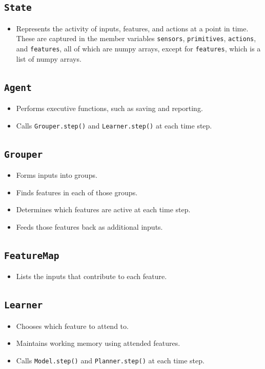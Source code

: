 \subsection{\texttt{State}}
\begin{itemize}
\item Represents the activity of inputs, features, and actions at a point in time. These are captured in the member variables \texttt{sensors}, \texttt{primitives}, \texttt{actions}, and \texttt{features}, all of which are numpy arrays, except for \texttt{features}, which is a list of numpy arrays. 
\end{itemize}

\subsection{\texttt{Agent}}
\begin{itemize}
\item Performs executive functions, such as saving and reporting.
\item Calls \texttt{Grouper.step()} and  \texttt{Learner.step()} at each time step.
\end{itemize}

\subsection{\texttt{Grouper}}
\begin{itemize}
\item Forms inputs into groups.
\item Finds features in each of those groups.
\item Determines which features are active at each time step.
\item Feeds those features back as additional inputs.
\end{itemize}

\subsection{\texttt{FeatureMap}}
\begin{itemize}
\item Lists the inputs that contribute to each feature.
\end{itemize}

\subsection{\texttt{Learner}}
\begin{itemize}
\item Chooses which feature to attend to.
\item Maintains working memory using attended features.
\item Calls \texttt{Model.step()} and  \texttt{Planner.step()} at each time step.
\end{itemize}

